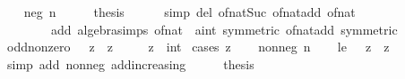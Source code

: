 \begin{isabellebody}
\isamarkupfalse%
\isanewline
\ \ \isamarkupfalse%
\ {\isacharparenleft}{\kern0pt}neg\ n{\isacharparenright}{\kern0pt}\isanewline
\ \ \isamarkupfalse%
\ \isamarkupfalse%
\ {\isacharquery}{\kern0pt}thesis\isanewline
\ \ \ \ \isamarkupfalse%
\ {\isacharparenleft}{\kern0pt}simp\ del{\isacharcolon}{\kern0pt}\ of{\isacharunderscore}{\kern0pt}nat{\isacharunderscore}{\kern0pt}Suc\ of{\isacharunderscore}{\kern0pt}nat{\isacharunderscore}{\kern0pt}add\ of{\isacharunderscore}{\kern0pt}nat{\isacharunderscore}{\kern0pt}{}\isanewline
\ \ \ \ \ \ \ \ add{\isacharcolon}{\kern0pt}\ algebra{\isacharunderscore}{\kern0pt}simps\ of{\isacharunderscore}{\kern0pt}nat{\isacharunderscore}{\kern0pt}{}\ {\isacharbrackleft}{\kern0pt}\ {\isacharprime}{\kern0pt}a{\isacharequal}{\kern0pt}int{\isacharcomma}{\kern0pt}\ symmetric{\isacharbrackright}{\kern0pt}\ of{\isacharunderscore}{\kern0pt}nat{\isacharunderscore}{\kern0pt}add\ {\isacharbrackleft}{\kern0pt}symmetric{\isacharbrackright}{\kern0pt}{\isacharparenright}{\kern0pt}\isanewline
{}\isamarkupfalse%
%
\endisatagproof
{\isafoldproof}%
%
\isadelimproof
%
\endisadelimproof
%
\isadelimdocument
%
\endisadelimdocument
%
\isatagdocument
%
\isamarkuptrue%
%
\endisatagdocument
{\isafolddocument}%
%
\isadelimdocument
%
\endisadelimdocument
{}\isamarkupfalse%
\ odd{\isacharunderscore}{\kern0pt}nonzero{\isacharcolon}{\kern0pt}\ {\isachardoublequoteopen}{}\ {\isacharplus}{\kern0pt}\ z\ {\isacharplus}{\kern0pt}\ z\ {\isasymnoteq}\ {}{\isachardoublequoteclose}\isanewline
\ \ \ z\ {\isacharcolon}{\kern0pt}{\isacharcolon}{\kern0pt}\ int\isanewline
%
\isadelimproof
%
\endisadelimproof
%
\isatagproof
{}\isamarkupfalse%
\ {\isacharparenleft}{\kern0pt}cases\ z{\isacharparenright}{\kern0pt}\isanewline
\ \ \isamarkupfalse%
\ {\isacharparenleft}{\kern0pt}nonneg\ n{\isacharparenright}{\kern0pt}\isanewline
\ \ \isamarkupfalse%
\ le{\isacharcolon}{\kern0pt}\ {\isachardoublequoteopen}{}\ {\isasymle}\ z\ {\isacharplus}{\kern0pt}\ z{\isachardoublequoteclose}\isanewline
\ \ \ \ \isamarkupfalse%
\ {\isacharparenleft}{\kern0pt}simp\ add{\isacharcolon}{\kern0pt}\ nonneg\ add{\isacharunderscore}{\kern0pt}increasing{\isacharparenright}{\kern0pt}\isanewline
\ \ \isamarkupfalse%
\ \isamarkupfalse%
\ {\isacharquery}{\kern0pt}thesis\isanewline

\end{isabellebody}
